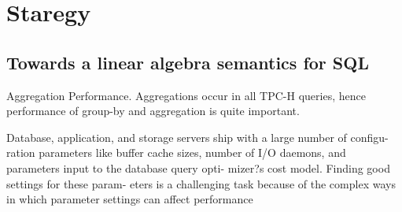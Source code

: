 \section{Staregy}
\indent
\subsection{Towards a linear algebra semantics for SQL}


Aggregation Performance.
Aggregations occur in all TPC-H queries, hence performance of group-by and aggregation is quite important.









Database, application, and storage servers ship with a large number of configu- ration parameters like buffer cache sizes, number of I/O daemons, and parameters input to the database query opti- mizer?s cost model. Finding good settings for these param- eters is a challenging task because of the complex ways in which parameter settings can affect performance

